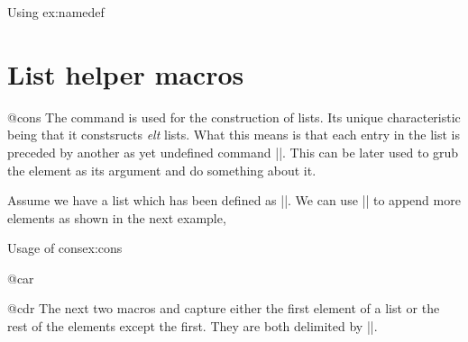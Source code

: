 \begin{teX}
\def\@namedef#1{\expandafter\def\csname #1\endcsname}
\def\@nameuse#1{\csname #1\endcsname}
\end{teX}


\begin{texexample}{Using \string\@namedef}{ex:namedef}
\makeatletter
{}
\makeatother
\end{texexample}

\section{List helper macros}

\begin{docCommand}{@cons} {}
The command \cmd{\@cons} is used for the construction of lists. Its unique
characteristic being that it constsructs \emph{elt} lists. What this means is that each entry in the list is
preceded by another as yet undefined command |\@elt|. This can be later used to grub the element as
its argument and do something about it.

\begin{teX}
\def\@cons#1#2{\begingroup\let\@elt\relax\xdef#1{#1\@elt #2}\endgroup}
\end{teX}
\end{docCommand}

Assume we have a list \cmd{\mylist} which has been defined as ||.
We can use |\@cons| to append more elements as shown in the next example,

\begin{texexample}{Usage of cons}{ex:cons}
\makeatletter
\def\mylist{}
\@cons\mylist{one}
\@cons\mylist{two}
\def\@elt{\space}
\mylist
\makeatother
\end{texexample}


\begin{docCommand}{@car}{}
\end{docCommand}
\begin{docCommand}{@cdr}{}
The next two macros \cmd{\@car} and \cmd{\@cdr} capture either the first element of a list or the rest of the elements
except the first. They are both delimited by |\@nil|.
\end{docCommand}




